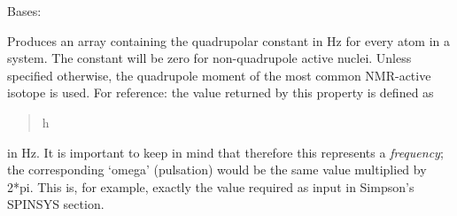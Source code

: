 \documentclass[letterpaper,10pt,english]{sphinxmanual}
\begin{document}
\begin{fulllineitems}
\label{doctree/soprano.properties.nmr.efg:soprano.properties.nmr.efg.EFGQuadrupolarConstant}
Bases: {\hyperref[doctree/soprano.properties.atomsproperty:soprano.properties.atomsproperty.AtomsProperty]{\emph{}}}

Produces an array containing the quadrupolar constant in Hz for every atom
in a system. The constant will be zero for non-quadrupole active nuclei.
Unless specified otherwise, the quadrupole moment of the most common
NMR-active isotope is used.
For reference: the value returned by this property is defined as
\begin{quote}

h
\end{quote}

in Hz. It is important to keep in mind that therefore this represents a 
\emph{frequency}; the corresponding `omega' (pulsation) would be the same value
multiplied by 2*pi. This is, for example, exactly the value required as
input in Simpson's SPINSYS section.


\end{fulllineitems}
\end{document}
